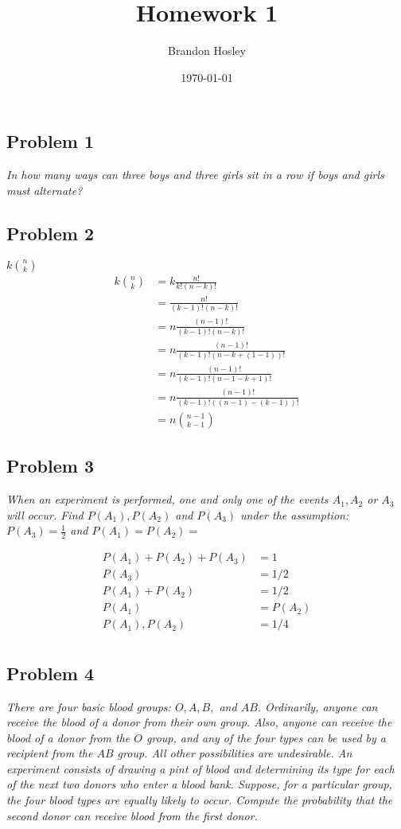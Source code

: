 \documentclass[a4paper,man,natbib]{apa6}
\title{Homework 1}
\author{Brandon Hosley}
\date{\today}
\affiliation{STAT 587 - Introduction to Probability and Statistics}
\begin{document}
\maketitle
\raggedbottom
\singlespacing

\subsection{Problem 1}
\emph{In how many ways can three boys and three girls sit in a row if boys and girls must alternate?}\vspace{1em}

\subsection{Problem 2}
\emph{$k\binom{n}{k}$}
\doublespacing
\begin{align*}
	k \binom{n}{k} &=  k \frac{n!}{k!(n-k)!} \\
	&= \frac{n!}{(k-1)!(n-k)!} \\
	&= n\frac{(n-1)!}{(k-1)!(n-k)!} \\
	&= n\frac{(n-1)!}{(k-1)!(n-k+(1-1))!} \\
	&= n\frac{(n-1)!}{(k-1)!(n-1-k+1)!} \\
	&= n\frac{(n-1)!}{(k-1)!((n-1)-(k-1))!} \\
	&= n\binom{n-1}{k-1}
\end{align*}
\singlespacing

\subsection{Problem 3}
\emph{When an experiment is performed, one and only one of the events $A_1,A_2$ or $A_3$ will occur. 
	Find $P(A_1), P(A_2)$ and $P(A_3)$ under the assumption: $P(A_3) = \frac{1}{2}$ and $P(A_1) = P(A_2)=$}

\begin{align*}
	P(A_1) + P(A_2) + P(A_3) &= 1 \\
	P(A_3) &= 1/2 \\
	P(A_1) + P(A_2) &= 1/2 \\
	P(A_1) &= P(A_2) \\
	P(A_1), P(A_2) &= 1/4 \\
\end{align*}

\subsection{Problem 4}
\emph{There are four basic blood groups: $O, A, B,$ and $AB$. 
	Ordinarily, anyone can receive the blood of a donor from their own group. Also, anyone can receive the blood of a donor from the $O$ group, and any of the four types can be used by a recipient from the $AB$ group. All other possibilities are undesirable. An experiment consists of drawing a pint of blood and determining its type for each of the next two donors who enter a blood bank. Suppose, for a particular group, the four blood types are equally likely to occur. Compute the probability that the second donor can receive blood from the first donor.} \vspace{1em}
\end{document}
